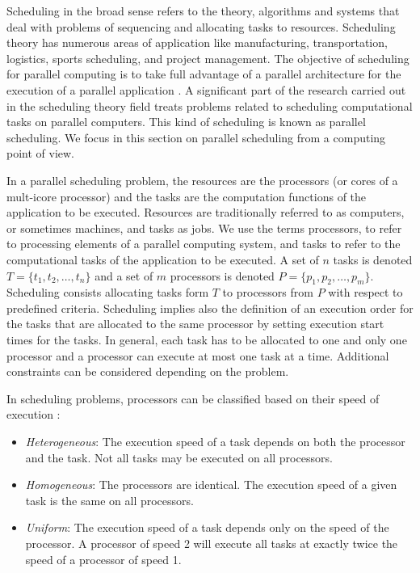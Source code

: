 Scheduling in the broad sense refers to the theory, algorithms and systems that deal with problems of sequencing and allocating tasks to resources. Scheduling theory has numerous areas of application like manufacturing, transportation, logistics, sports scheduling, and project management. The objective of scheduling for parallel computing is to take full advantage of a parallel architecture for the execution of a parallel application . A significant part of the research carried out in the scheduling theory field treats problems related to scheduling computational tasks on parallel computers. This kind of scheduling is known as parallel scheduling. We focus in this section on parallel scheduling from a computing point of view.

In a parallel scheduling problem, the resources are the processors (or cores of a mult-icore processor) and the tasks are the computation functions of the application to be executed. Resources are traditionally referred to as computers, or sometimes machines, and tasks as jobs. We use the terms processors, to refer to processing elements of a parallel computing system, and tasks to refer to the computational tasks of the application to be executed. A set of $n$ tasks is denoted $T = \{t_1, t_2, \ldots, t_n\}$ and a set of $m$ processors is denoted $P = \{p_1, p_2, \ldots, p_m\}$. Scheduling consists allocating tasks form $T$ to processors from $P$ with respect to predefined criteria. Scheduling implies also the definition of an execution order for the tasks that are allocated to the same processor by setting execution start times for the tasks. In general, each task has to be allocated to one and only one processor and a processor can execute at most one task at a time. Additional constraints can be considered depending on the problem.

In scheduling problems, processors can be classified based on their speed of execution \cite{davis:2011}:

\begin{itemize}
\item \textit{Heterogeneous}: The execution speed of a task depends on both the processor and the task. Not all tasks may be executed on all processors.
\item \textit{Homogeneous}: The processors are identical. The execution speed of a given task is the same on all processors.
\item \textit{Uniform}: The execution speed of a task depends only on the speed of the processor. A processor of speed 2 will execute all tasks at exactly twice the speed of a processor of speed 1.
\end{itemize}

